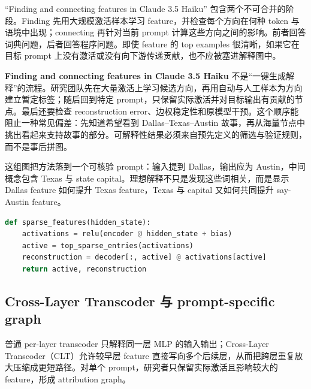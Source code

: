 “Finding and connecting features in Claude 3.5 Haiku” 包含两个不可合并的阶段。Finding 先用大规模激活样本学习 feature，并检查每个方向在何种 token 与语境中出现；connecting 再针对当前 prompt 计算这些方向之间的影响。前者回答词典问题，后者回答程序问题。即使 feature 的 top examples 很清晰，如果它在目标 prompt 上没有激活或没有向下游传递贡献，也不应被塞进解释图中。


\textbf{Finding and connecting features in Claude 3.5 Haiku} 不是“一键生成解释”的流程。研究团队先在大量激活上学习候选方向，再用自动与人工样本为方向建立暂定标签；随后回到特定 prompt，只保留实际激活并对目标输出有贡献的节点。最后还要检查 reconstruction error、边权稳定性和原模型干预。这个顺序能阻止一种常见偏差：先知道希望看到 Dallas--Texas--Austin 故事，再从海量节点中挑出看起来支持故事的部分。可解释性结果必须来自预先定义的筛选与验证规则，而不是事后拼图。


这组图把方法落到一个可核验 prompt：输入提到 Dallas，输出应为 Austin，中间概念包含 Texas 与 state capital。理想解释不只是发现这些词相关，而是显示 Dallas feature 如何提升 Texas feature，Texas 与 capital 又如何共同提升 say-Austin feature。

\begin{lstlisting}[language=Python,caption={稀疏 feature 提取：用少量非零方向近似密集 MLP 输出}]
def sparse_features(hidden_state):
    activations = relu(encoder @ hidden_state + bias)
    active = top_sparse_entries(activations)
    reconstruction = decoder[:, active] @ activations[active]
    return active, reconstruction
\end{lstlisting}

\subsection{Cross-Layer Transcoder 与 prompt-specific graph}

普通 per-layer transcoder 只解释同一层 MLP 的输入输出；Cross-Layer Transcoder（CLT）允许较早层 feature 直接写向多个后续层，从而把跨层重复放大压缩成更短路径。对单个 prompt，研究者只保留实际激活且影响较大的 feature，形成 attribution graph。


